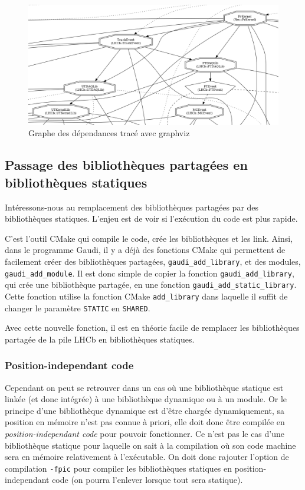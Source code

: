 \documentclass[a4paper,11pt]{report}
\begin{document}
\begin{figure}[H]
    \includegraphics[width=\textwidth]{graphviz_cropped.png}
    \caption{Graphe des dépendances tracé avec graphviz}
    \label{Graphviz}
\end{figure}

\subsection{Passage des bibliothèques partagées en bibliothèques statiques}
Intéressons-nous au remplacement des bibliothèques partagées par des bibliothèques statiques.
L'enjeu est de voir si l'exécution du code est plus rapide.

C'est l'outil CMake qui compile le code, crée les bibliothèques et les link.
Ainsi, dans le programme Gaudi, il y a déjà des fonctions CMake qui permettent de facilement créer des bibliothèques partagées, \verb'gaudi_add_library', et des modules, \verb'gaudi_add_module'.
Il est donc simple de copier la fonction \verb'gaudi_add_library', qui crée une bibliothèque partagée, en une fonction \verb'gaudi_add_static_library'.
Cette fonction utilise la fonction CMake \verb'add_library' dans laquelle il suffit de changer le paramètre \verb'STATIC' en \verb'SHARED'.

Avec cette nouvelle fonction, il est en théorie facile de remplacer les bibliothèques partagée de la pile LHCb en bibliothèques statiques.

\subsubsection{Position-independant code}
Cependant on peut se retrouver dans un cas où une bibliothèque statique est linkée (et donc intégrée) à une bibliothèque dynamique ou à un module.
Or le principe d'une bibliothèque dynamique est d'être chargée dynamiquement, sa position en mémoire n'est pas connue à priori, elle doit donc être compilée en \emph{position-independant code} pour pouvoir fonctionner.
Ce n'est pas le cas d'une bibliothèque statique pour laquelle on sait à la compilation où son code machine sera en mémoire relativement à l'exécutable.
On doit donc rajouter l'option de compilation \verb'-fpic' pour compiler les bibliothèques statiques en position-independant code (on pourra l'enlever lorsque tout sera statique).
\end{document}
